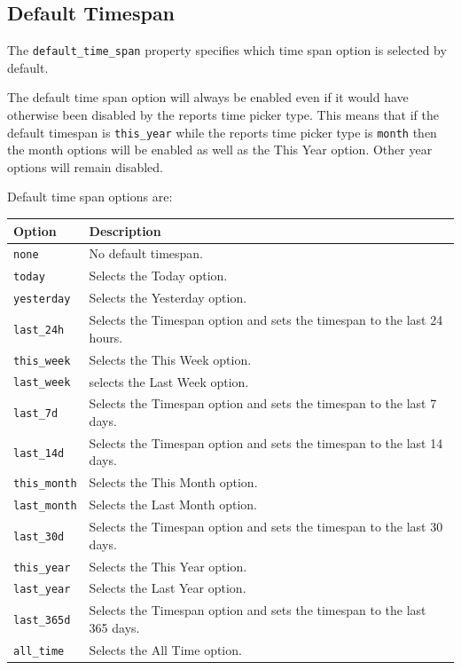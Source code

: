 \documentclass[a4paper,10pt]{book}
\begin{document}
\subsection{Default Timespan}
The \verb|default_time_span| property specifies which time span option is selected by default. 

The default time span option will always be enabled even if it would have otherwise been disabled by the reports time picker type. This means that if the default timespan is \verb|this_year| while the reports time picker type is \verb|month| then the month options will be enabled as well as the This Year option. Other year options will remain disabled.


Default time span options are:

\begin{tabular}{p{2.5cm} l}
\hline
\textbf{Option} & \textbf{Description} \\
\hline
\verb|none| & No default timespan.\\
\verb|today| & Selects the Today option.\\
\verb|yesterday| & Selects the Yesterday option.\\
\verb|last_24h|  & Selects the Timespan option and sets the timespan to the last 24 hours.\\
\verb|this_week| & Selects the This Week option.\\
\verb|last_week| & selects the Last Week option.\\
\verb|last_7d| & Selects the Timespan option and sets the timespan to the last 7 days.\\
\verb|last_14d| & Selects the Timespan option and sets the timespan to the last 14 days.\\
\verb|this_month| & Selects the This Month option.\\
\verb|last_month| & Selects the Last Month option.\\
\verb|last_30d| & Selects the Timespan option and sets the timespan to the last 30 days.\\
\verb|this_year| & Selects the This Year option.\\
\verb|last_year| & Selects the Last Year option.\\
\verb|last_365d| & Selects the Timespan option and sets the timespan to the last 365 days.\\
\verb|all_time| & Selects the All Time option.\\
\hline
\end{tabular}
\end{document}
